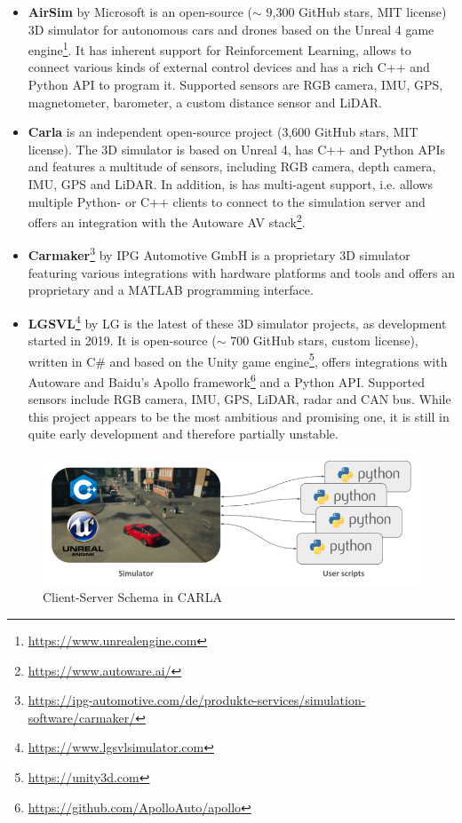 \begin{itemize}
	\item \textbf{AirSim} by Microsoft \cite{airsim2017fsr} is an open-source ($\sim$ 9,300 GitHub stars, MIT license) 3D simulator for autonomous cars and drones based on the Unreal 4 game engine\footnote{\url{https://www.unrealengine.com}}. It has inherent support for Reinforcement Learning, allows to connect various kinds of external control devices and has a rich C++ and Python API to program it. Supported sensors are RGB camera, IMU, GPS, magnetometer, barometer, a custom distance sensor and LiDAR. 
	\item \textbf{Carla} \cite{Dosovitskiy17} is an independent open-source project (3,600 GitHub stars, MIT license). The 3D simulator is based on Unreal 4, has C++ and Python APIs and features a multitude of sensors, including RGB camera, depth camera, IMU, GPS and LiDAR. In addition, is has multi-agent support, i.e. allows multiple Python- or C++ clients to connect to the simulation server and offers an integration with the Autoware AV stack\footnote{\url{https://www.autoware.ai/}}.
	\item \textbf{Carmaker}\footnote{\url{https://ipg-automotive.com/de/produkte-services/simulation-software/carmaker/}} by IPG Automotive GmbH is a proprietary 3D simulator featuring various integrations with hardware platforms and tools and offers an proprietary and a MATLAB programming interface.
	\item \textbf{LGSVL}\footnote{\url{https://www.lgsvlsimulator.com}} by LG is the latest of these 3D simulator projects, as development started in 2019. It is open-source ($\sim$ 700 GitHub stars, custom license), written in C\# and based on the Unity game engine\footnote{\url{https://unity3d.com}}, offers integrations with Autoware and Baidu's Apollo framework\footnote{\url{https://github.com/ApolloAuto/apollo}} and a Python API. Supported sensors include RGB camera, IMU, GPS, LiDAR, radar and CAN bus. While this project appears to be the most ambitious and promising one, it is still in quite early development and therefore partially unstable.
\end{itemize}

\begin{figure}
	\centering
	\includegraphics[width=0.8\linewidth]{98_images/carla_modules}
	\caption[Client-Server Schema in CARLA]{Client-Server Schema in CARLA \cite{CarlaContributors}}
	\label{fig:carla_modules}
\end{figure}

